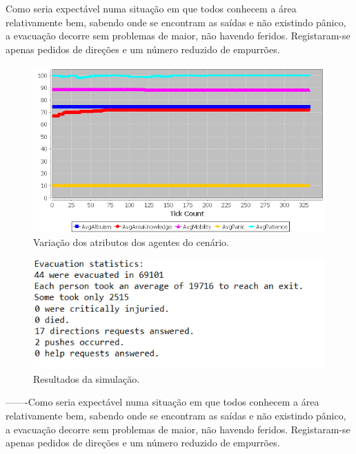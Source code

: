 \documentclass[12pt]{article}
\begin{document}
\begin{titlepage}
\begin{itemize}
Como seria expectável numa situação em que todos conhecem a área relativamente bem, sabendo onde se encontram as saídas e não existindo pânico, a evacuação decorre sem problemas de maior, não havendo feridos. Registaram-se apenas pedidos de direções e um número reduzido de empurrões.

\begin{figure}[H]
	\centering
	\includegraphics{graph_sc1.png}
	\caption{Variação dos atributos dos agentes do cenário.}
	\label{graph_sc1}
\end{figure}

\begin{figure}[H]
	\centering
	\includegraphics{log_sc1.png}
	\caption{Resultados da simulação.}
	\label{log_sc1}
\end{figure}

-------Como seria expectável numa situação em que todos conhecem a área relativamente bem, sabendo onde se encontram as saídas e não existindo pânico, a evacuação decorre sem problemas de maior, não havendo feridos. Registaram-se apenas pedidos de direções e um número reduzido de empurrões.


\end{itemize}
\end{titlepage}
\end{document}
